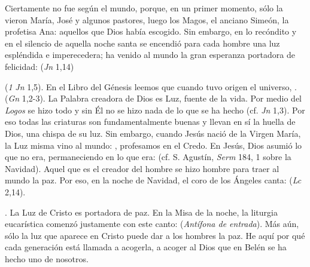 Ciertamente no fue  según el mundo, porque, en un primer momento, sólo la vieron María, José y algunos pastores, luego los Magos, el anciano Simeón, la profetisa Ana: aquellos que Dios había escogido. Sin embargo, en lo recóndito y en el silencio de aquella noche santa se encendió para cada hombre una luz espléndida e imperecedera; ha venido al mundo la gran esperanza portadora de felicidad:  (\emph{Jn} 1,14)

 (\emph{1} \emph{Jn} 1,5). En el Libro del Génesis leemos que cuando tuvo origen el universo, .  (\emph{Gn} 1,2-3). La Palabra creadora de Dios es Luz, fuente de la vida. Por medio del \emph{Logos} se hizo todo y sin Él no se hizo nada de lo que se ha hecho (cf. \emph{Jn} 1,3). Por eso todas las criaturas son fundamentalmente buenas y llevan en sí la huella de Dios, una chispa de su luz. Sin embargo, cuando Jesús nació de la Virgen María, la Luz misma vino al mundo: , profesamos en el Credo. En Jesús, Dios asumió lo que no era, permaneciendo en lo que era:  (cf. S. Agustín, \emph{Serm} 184, 1 sobre la Navidad). Aquel que es el creador del hombre se hizo hombre para traer al mundo la paz. Por eso, en la noche de Navidad, el coro de los Ángeles canta:  (\emph{Lc} 2,14).

\emph{}. La Luz de Cristo es portadora de paz. En la Misa de la noche, la liturgia eucarística comenzó justamente con este canto:  (\emph{Antífona de entrada}). Más aún, sólo la  luz que aparece en Cristo puede dar a los hombres la  paz. He aquí por qué cada generación está llamada a acogerla, a acoger al Dios que en Belén se ha hecho uno de nosotros.

